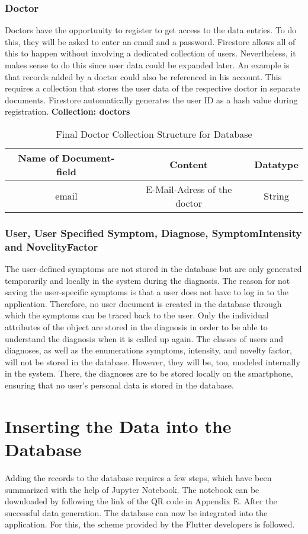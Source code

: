 \subsubsection{Doctor}
Doctors have the opportunity to register to get access to the data entries. To do this, they will be asked to enter an email and a password. Firestore allows all of this to happen without involving a dedicated collection of users. Nevertheless, it makes sense to do this since user data could be expanded later. An example is that records added by a doctor could also be referenced in his account. This requires a collection that stores the user data of the respective doctor in separate documents. Firestore automatically generates the user ID as a hash value during registration.
 \newline
\textbf{Collection: doctors}
\begin{table}[H]
	\centering
	\begin{tabular}{ | c| c| c | } 
		\hline
		Name of Document-field& Content & Datatype \\  
		\hline
		email & E-Mail-Adress of the doctor & String \\
		\hline
	\end{tabular}
	\caption{Final Doctor Collection Structure for Database}
\end{table}
\subsubsection{User, User Specified Symptom, Diagnose, SymptomIntensity and NovelityFactor}
The user-defined symptoms are not stored in the database but are only generated temporarily and locally in the system during the diagnosis. The reason for not saving the user-specific symptoms is that a user does not have to log in to the application. Therefore, no user document is created in the database through which the symptoms can be traced back to the user. Only the individual attributes of the object are stored in the diagnosis in order to be able to understand the diagnosis when it is called up again. The classes of users and diagnoses, as well as the enumerations symptoms, intensity, and novelty factor, will not be stored in the database. However, they will be, too, modeled internally in the system. There, the diagnoses are to be stored locally on the smartphone, ensuring that no user's personal data is stored in the database.

\section{Inserting the Data into the Database}
Adding the records to the database requires a few steps, which have been summarized with the help of Jupyter Notebook. The notebook can be downloaded by following the link of the QR code in Appendix E. After the successful data generation. The database can now be integrated into the application. For this, the scheme provided by the Flutter developers is followed.